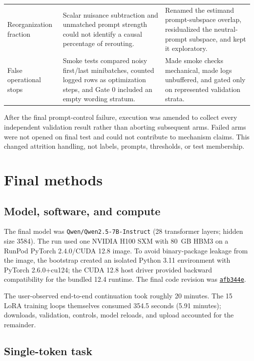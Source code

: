 \documentclass[11pt]{article}
\newcommand{\code}[1]{\texttt{#1}}
\begin{document}
\begin{longtable}{p{}p{}p{}}
Reorganization fraction & Scalar nuisance subtraction and unmatched prompt strength
could not identify a causal percentage of rerouting. & Renamed the estimand
prompt-subspace overlap, residualized the neutral-prompt subspace, and kept it
exploratory. \\

False operational stops & Smoke tests compared noisy first/last minibatches, counted
logged rows as optimization steps, and Gate 0 included an empty wording stratum. &
Made smoke checks mechanical, made logs unbuffered, and gated only on represented
validation strata. \\
\bottomrule
\end{longtable}

After the final prompt-control failure, execution was amended to collect every
independent validation result rather than aborting subsequent arms.  Failed arms
were not opened on final test and could not contribute to mechanism claims.  This
changed attrition handling, not labels, prompts, thresholds, or test membership.

\section{Final methods}

\subsection{Model, software, and compute}

The final model was \code{Qwen/Qwen2.5-7B-Instruct} (28 transformer layers; hidden
size 3584).  The run used one NVIDIA H100 SXM with 80~GB HBM3 on a RunPod PyTorch
2.4.0/CUDA 12.8 image.  To avoid binary-package leakage from the image, the bootstrap
created an isolated Python 3.11 environment with PyTorch 2.6.0+cu124; the CUDA 12.8
host driver provided backward compatibility for the bundled 12.4 runtime.  The final
code revision was
\href{https://github.com/anthnguyen/chipmunk/commit/afb344eacbfb4dd6e5d7fc63d53821df00e22065}{\code{afb344e}}.

The user-observed end-to-end continuation took roughly 20 minutes.  The 15 LoRA
training loops themselves consumed 354.5 seconds (5.91 minutes); downloads,
validation, controls, model reloads, and upload accounted for the remainder.

\subsection{Single-token task}
\end{document}
